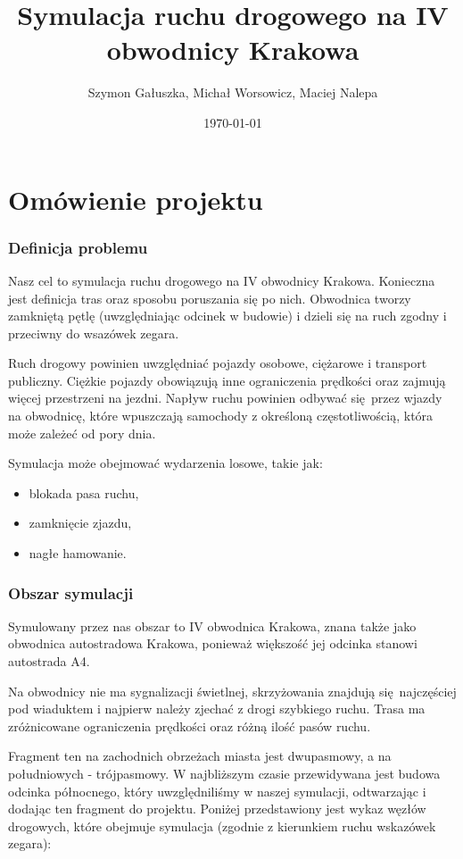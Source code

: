 \documentclass[a4paper,12pt]{article}
\title{Symulacja ruchu drogowego na IV obwodnicy Krakowa}
\author{Szymon Gałuszka, Michał Worsowicz, Maciej Nalepa}
\date{\today}
\begin{document}
    \maketitle

    \part{Omówienie projektu}

	\section{Definicja problemu}
	
	Nasz cel to symulacja ruchu drogowego na IV obwodnicy Krakowa.
	Konieczna jest definicja tras oraz sposobu poruszania się po nich.
	Obwodnica tworzy zamkniętą pętlę (uwzględniając odcinek w budowie) i dzieli się na ruch zgodny i przeciwny do wsazówek zegara.
	
	Ruch drogowy powinien uwzględniać pojazdy osobowe, ciężarowe i transport publiczny.
	Ciężkie pojazdy obowiązują inne ograniczenia prędkości oraz zajmują więcej przestrzeni na jezdni.
	Napływ ruchu powinien odbywać się przez wjazdy na obwodnicę, które wpuszczają samochody z określoną częstotliwością, która może zależeć od pory dnia.
	
	Symulacja może obejmować wydarzenia losowe, takie jak:
	
	\begin{itemize}
		\item blokada pasa ruchu,
		\item zamknięcie zjazdu,
		\item nagłe hamowanie.
    \end{itemize}
    
    \sloppy
    \section{Obszar symulacji}
	Symulowany przez nas obszar to IV obwodnica Krakowa, znana także jako obwodnica autostradowa Krakowa, ponieważ większość jej odcinka stanowi autostrada A4.
	
	Na obwodnicy nie ma sygnalizacji świetlnej, skrzyżowania znajdują się najczęściej pod wiaduktem i najpierw należy zjechać z drogi szybkiego ruchu.
	Trasa ma zróżnicowane ograniczenia prędkości oraz różną ilość pasów ruchu.
	
	Fragment ten na zachodnich obrzeżach miasta jest dwupasmowy, a na południowych - trójpasmowy. W najbliższym czasie przewidywana jest budowa odcinka północnego, który uwzględniliśmy w naszej symulacji, odtwarzając i dodając ten fragment do projektu. Poniżej przedstawiony jest wykaz węzłów drogowych, które obejmuje symulacja (zgodnie z kierunkiem ruchu wskazówek zegara):
	
\end{document}

